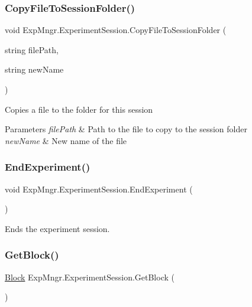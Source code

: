 \subsubsection{\texorpdfstring{Copy\+File\+To\+Session\+Folder()}{CopyFileToSessionFolder()}\hspace{0.1cm}{\footnotesize\ttfamily [2/2]}}
{\footnotesize\ttfamily void Exp\+Mngr.\+Experiment\+Session.\+Copy\+File\+To\+Session\+Folder (\begin{DoxyParamCaption}\item[{string}]{file\+Path,  }\item[{string}]{new\+Name }\end{DoxyParamCaption})}



Copies a file to the folder for this session 


\begin{DoxyParams}{Parameters}
{\em file\+Path} & Path to the file to copy to the session folder\\
\hline
{\em new\+Name} & New name of the file\\
\hline
\end{DoxyParams}
\mbox{\label{class_exp_mngr_1_1_experiment_session_a831911945b3852b392b6e9456bc91e05}} 
\subsubsection{\texorpdfstring{End\+Experiment()}{EndExperiment()}}
{\footnotesize\ttfamily void Exp\+Mngr.\+Experiment\+Session.\+End\+Experiment (\begin{DoxyParamCaption}{ }\end{DoxyParamCaption})}



Ends the experiment session. 

\mbox{\label{class_exp_mngr_1_1_experiment_session_a891451cca778e4f355959cf921af138c}} 
\subsubsection{\texorpdfstring{Get\+Block()}{GetBlock()}\hspace{0.1cm}{\footnotesize\ttfamily [1/2]}}
{\footnotesize\ttfamily \hyperlink{class_exp_mngr_1_1_block}{Block} Exp\+Mngr.\+Experiment\+Session.\+Get\+Block (\begin{DoxyParamCaption}{ }\end{DoxyParamCaption})}



